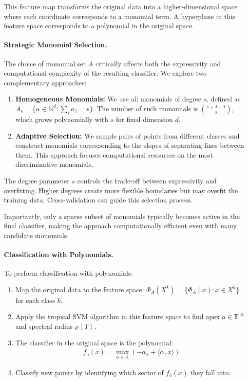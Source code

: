 \documentclass{article}
\newcommand{\trop}{\mathbb{T}}
\begin{document}
This feature map transforms the original data into a higher-dimensional space where each coordinate corresponds to a monomial term. A hyperplane in this feature space corresponds to a polynomial in the original space.

\paragraph{Strategic Monomial Selection.}
The choice of monomial set $A$ critically affects both the expressivity and computational complexity of the resulting classifier. We explore two complementary approaches:

\begin{enumerate}
    \item \textbf{Homogeneous Monomials:} We use all monomials of degree $s$, defined as 
    $A_s = \{\alpha \in \mathbb{N}^d : \sum_i \alpha_i = s\}$. The number of such monomials is $\binom{s+d-1}{s}$, which grows polynomially with $s$ for fixed dimension $d$.
    
    \item \textbf{Adaptive Selection:} We sample pairs of points from different classes and construct monomials corresponding to the slopes of separating lines between them. This approach focuses computational resources on the most discriminative monomials.
\end{enumerate}

The degree parameter $s$ controls the trade-off between expressivity and overfitting. Higher degrees create more flexible boundaries but may overfit the training data. Cross-validation can guide this selection process.

Importantly, only a sparse subset of monomials typically becomes active in the final classifier, making the approach computationally efficient even with many candidate monomials.

\paragraph{Classification with Polynomials.}\label{subsec:poly_classification}
To perform classification with polynomials:

\begin{enumerate}
    \item Map the original data to the feature space: $\Phi_A(X^k) = \{\Phi_A(x) : x \in X^k\}$ for each class $k$.
    
    \item Apply the tropical SVM algorithm in this feature space to find apex $a \in \trop^{|A|}$ and spectral radius $\rho(T)$.
    
    \item The classifier in the original space is the polynomial:
    \begin{align}
    f_a(x) = \max_{\alpha \in A} (-a_\alpha + \langle \alpha, x \rangle).
    \end{align}
    
    \item Classify new points by identifying which sector of $f_a(x)$ they fall into.
\end{enumerate}
\end{document}
